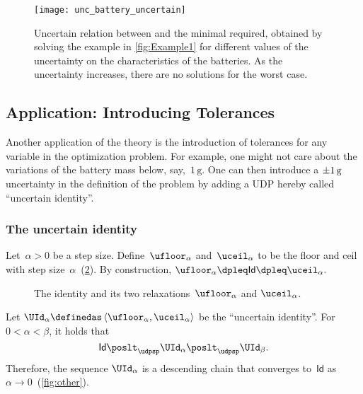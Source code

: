 \begin{figure}[h]
	\begin{centering}
		\texttt{[image: unc\_battery\_uncertain]}
	\end{centering}
	\caption{
		Uncertain relation between  and the minimal  required, obtained by solving the example in \cref{fig:Example1} for different values of the uncertainty on the characteristics of the batteries.
		As the uncertainty increases, there are no solutions for the worst case.
	}
	\label{fig:unc_battery_uncertain}
\end{figure}

\subsection{Application: Introducing Tolerances\label{sec:Application-tolerance}}

Another application of the theory is the introduction of tolerances
for any variable in the optimization problem.
For example, one might
not care about the variations of the battery mass below, say,~$1\,\text{g}$.
One can then introduce a $\pm1\,\text{\ensuremath{\text{g}} }$ uncertainty
in the definition of the problem by adding a UDP hereby called ``uncertain
identity''.

\subsubsection{The uncertain identity}

Let~$\alpha>0$ be a step size.
Define~$\ufloor_{\alpha}$ and~$\uceil_{\alpha}$
to be the floor and ceil with step size~$\alpha$~(\cref{fig:identity_approximation}).
By construction, $\ufloor_{\alpha}\dpleq\mathsf{Id}\dpleq\uceil_{\alpha}.
$

\begin{figure}[h]
	\hfill{}\hfill{}

	\caption{The identity and its two relaxations~$\ufloor_{\alpha}$
		and $\uceil_{\alpha}$.}
	\label{fig:identity_approximation}
\end{figure}

Let $\UId_{\alpha}\definedas\left\langle \ufloor_{\alpha},\uceil_{\alpha}\right\rangle $
be the ``uncertain identity''.
For~$0<\alpha<\beta$, it holds
that
\[
	\mathsf{Id}\poslt_{\udpsp}\UId_{\alpha}\poslt_{\udpsp}\UId_{\beta}.
\]
Therefore, the sequence $\UId_{\alpha}$ is a descending chain that
converges to~$\mathsf{Id}$ as~$\alpha\rightarrow0$~(\cref{fig:other}).

